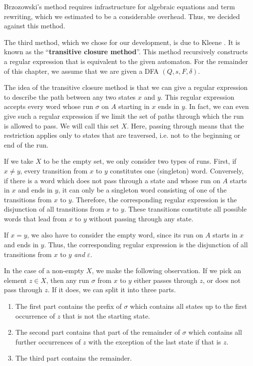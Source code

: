 Brzozowski's method requires infrastructure for algebraic equations and term rewriting, 
which we estimated to be a considerable overhead. Thus, we decided against this method.


The third method, which we chose for our development, is due to Kleene \cite{KleeneNets}.
It is known as the ``\textbf{transitive closure method}''.
This method recursively constructs a regular expression that is equivalent to the given automaton.
For the remainder of this chapter, we assume that we are given a DFA $(Q,s,F,\delta)$.


The idea of the transitive closure method is that we can give a regular expression to describe the path between any two states $x$ and $y$.
This regular expression accepts every word whose run $\sigma$ on $A$ starting in $x$ ends in $y$.
In fact, we can even give such a regular expression if we limit the set of paths through which the run is allowed to pass. 
We will call this set $X$.
Here, passing through means that the restriction applies only to states that are traversed, 
i.e. not to the beginning or end of the run.


If we take $X$ to be the empty set, we only consider two types of runs.
First, if $x \neq y$, every transition from $x$ to $y$ constitutes one (singleton) word. 
Conversely, if there is a word which does not pass through a state and whose run on $A$ starts in $x$ and ends in $y$, 
it can only be a singleton word consisting of one of the transitions from $x$ to $y$.
Therefore, the corresponding regular expression is the disjunction of all transitions from $x$ to $y$. 
These transitions constitute all possible words that lead from $x$ to $y$ without passing through any state.

If $x = y$, we also have to consider the empty word, since its run on $A$ starts in $x$ and ends in $y$.
Thus, the corresponding regular expression is the disjunction of all transitions from $x$ to $y$ \textit{and} $\varepsilon$.


In the case of a non-empty $X$, we make the following observation. 
If we pick an element $z \in X$, then any run $\sigma$ from $x$ to $y$ either passes through $z$, or does not pass through $z$.
If it does, we can split it into three parts.
\begin{enumerate}[label=(\roman*)]
    \item  \label{R_xz}
        The first part contains the prefix of $\sigma$ which contains all states up to the first occurrence of $z$ that is not the starting state.
    \item  \label{R_zz}
        The second part contains that part of the remainder of $\sigma$ which contains all further occurrences of $z$ with the exception of the last state if that is $z$.
    \item  \label{R_zy}
        The third part contains the remainder.
\end{enumerate}

